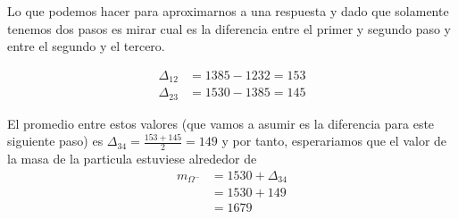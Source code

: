 \documentclass[12pt]{amsart}
\begin{document}
Lo que podemos hacer para aproximarnos a una respuesta y dado que solamente tenemos dos pasos es mirar cual es la diferencia entre el primer y segundo paso y entre el segundo y el tercero.

\begin{align*}
  \Delta_{12} &= 1385 - 1232 = 153\\
  \Delta_{23} &= 1530 - 1385 = 145
\end{align*}

El promedio entre estos valores (que vamos a asumir es la diferencia para este siguiente paso) es $\Delta_{34} = \frac{153 + 145}{2} = 149$ y por tanto, esperariamos que el valor de la masa de la particula estuviese alrededor de
\begin{align*}
  m_{\Omega^{-}} &= 1530 + \Delta_{34}\\
  &= 1530 + 149\\
  &= 1679
\end{align*}
\end{document}
